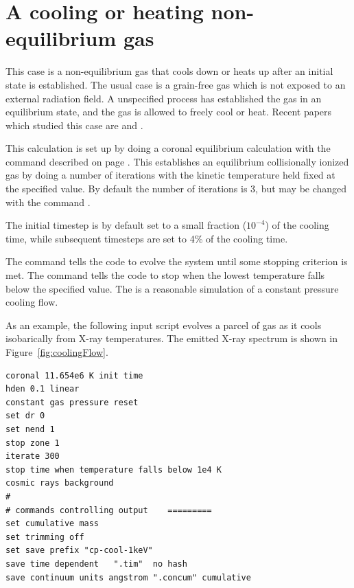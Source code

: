 \section{A cooling or heating non-equilibrium gas}
\label{sec:Cooling-Heating-NonEq}

This case is a non-equilibrium gas that cools down or heats up
after an initial state is established.
The usual case is a grain-free gas which is not exposed to
an external radiation field.
A unspecified process has established the gas in an equilibrium
state, and the gas is allowed to freely cool or heat.
Recent papers which studied this case are
\citet{Chatzikos2015} and \citet{GnatSternberg07}.

This calculation is set up by doing a coronal equilibrium
calculation with the  command
described on page \pageref{sec:CommandCoronalEquilibrium}.
This establishes an equilibrium collisionally ionized
gas by doing a number of iterations with the kinetic temperature
held fixed at the specified value.
By default the number of iterations is 3, but may be changed
with the command .

The initial timestep is by default set to a small fraction
($10^{-4}$) of the cooling time, while subsequent timesteps
are set to 4\% of the cooling time.

The  command tells the code to evolve
the system until some stopping criterion is met.
The command 
tells the code to stop when the lowest temperature falls
below the specified value.
The is a reasonable simulation of a constant pressure cooling flow.

As an example, the following input script evolves a parcel of gas
as it cools isobarically from X-ray temperatures.
The emitted X-ray spectrum is shown in Figure~\ref{fig:coolingFlow}.
%
\begin{verbatim}
coronal 11.654e6 K init time
hden 0.1 linear
constant gas pressure reset
set dr 0
set nend 1
stop zone 1
iterate 300
stop time when temperature falls below 1e4 K
cosmic rays background
#
# commands controlling output    =========
set cumulative mass
set trimming off
set save prefix "cp-cool-1keV"
save time dependent   ".tim"  no hash
save continuum units angstrom ".concum" cumulative
\end{verbatim}

